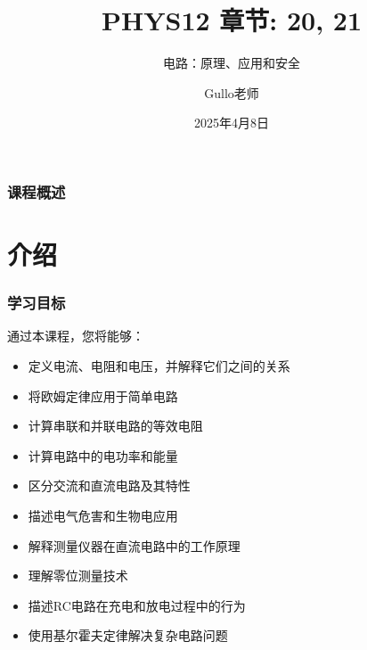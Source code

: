 \documentclass{beamer}
\title[电路学]{PHYS12 章节: 20, 21}
\subtitle{电路：原理、应用和安全}
\author[Gullo老师]{Gullo老师}
\date[2025年4月]{2025年4月8日}
\institute[物理系]{物理系}
\begin{document}
\begin{frame}
    \titlepage
\end{frame}

\begin{frame}
    \frametitle{课程概述}
    \tableofcontents
\end{frame}

\section{介绍}
\begin{frame}
    \frametitle{学习目标}
    \begin{block}{通过本课程，您将能够：}
        \begin{itemize}
            \item 定义电流、电阻和电压，并解释它们之间的关系
            \item 将欧姆定律应用于简单电路
            \item 计算串联和并联电路的等效电阻
            \item 计算电路中的电功率和能量
            \item 区分交流和直流电路及其特性
            \item 描述电气危害和生物电应用
            \item 解释测量仪器在直流电路中的工作原理
            \item 理解零位测量技术
            \item 描述RC电路在充电和放电过程中的行为
            \item 使用基尔霍夫定律解决复杂电路问题
        \end{itemize}
    \end{block}
\end{frame}

\end{document}
